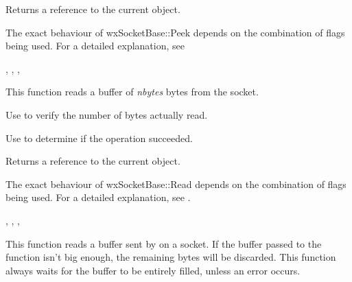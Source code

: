 
Returns a reference to the current object.


The exact behaviour of wxSocketBase::Peek depends on the combination
of flags being used. For a detailed explanation, see 


, 
, 
, 

%
%
\label{wxsocketbaseread}


This function reads a buffer of {\it nbytes} bytes from the socket.

Use  to verify the number of bytes actually read.

Use  to determine if the operation succeeded.





Returns a reference to the current object.


The exact behaviour of wxSocketBase::Read depends on the combination
of flags being used. For a detailed explanation, see .


, 
, 
, 

%
%
\label{wxsocketbasereadmsg}


This function reads a buffer sent by  
on a socket. If the buffer passed to the function isn't big enough, the
remaining bytes will be discarded. This function always waits for the
buffer to be entirely filled, unless an error occurs.

